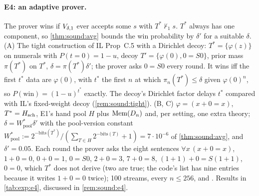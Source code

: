\paragraph{E4: an adaptive prover.}
The prover wins if $V_{\delta,1}$ ever accepts some $s$ with $T^*\nvdash_1s$. $T^*$ always has one component, so \cref{thm:sound:avg} bounds the win probability by $\delta'$ for a suitable $\delta$.
(A) The tight construction of IL Prop~C.5 \citep{claude2026whatfollows} with a Dirichlet decoy: $T^*=\{\varphi(z)\}$ on numerals with $P(t=0)=1-u$, decoy $T'=\{\varphi(0),0=S0\}$, prior mass $\pi(T^*)$ on $T^*$, $\delta=\pi(T^*)\delta'$; the prover asks $0=S0$ every round. It wins iff the first $t^*$ data are $\varphi(0)$, with $t^*$ the first $n$ at which $\pi_n(T^*)\le\delta$ given $\varphi(0)^n$, so $P(\text{win})=(1-u)^{t^*}$ exactly. The decoy's Dirichlet factor delays $t^*$ compared with IL's fixed-weight decoy (\cref{rem:sound:tight}).
(B, C) $\varphi=(x+0=x)$, $T^*=H_{\mathrm{sch}}$, E1's hand pool $H$ plus $\mathrm{Mem}(D_n)$ and, per setting, one extra theory; $\delta=W^*_{\mathrm{pool}}\delta'$ with the pool-version constant $W^*_{\mathrm{pool}}:=2^{-\mathrm{bits}(T^*)}/(\sum_{T\in H}2^{-\mathrm{bits}(T)}+1)=7\cdot10^{-6}$ of \cref{thm:sound:avg}, and $\delta'=0.05$. Each round the prover asks the eight sentences $\forall x\,(x+0=x)$, $1+0=0$, $0+0=1$, $0=S0$, $2+0=3$, $7+0=8$, $(1+1)+0=S(1+1)$, $0=0$, which $T^*$ does not derive (two are true; the code's list has nine entries because it writes $1+0=0$ twice); 100 streams, every $n\le256$, \Lzero{} and \Lone. Results in \cref{tab:exp:e4}, discussed in \cref{rem:sound:e4}.


